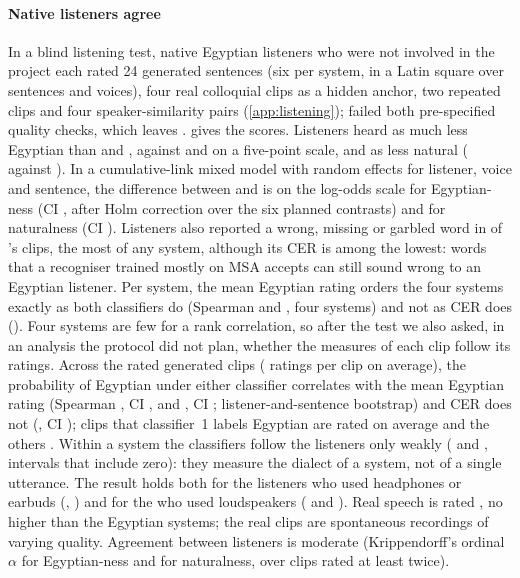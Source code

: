 \paragraph{Native listeners agree}
In a blind listening test,  native Egyptian listeners who were not involved in the project each rated
24 generated sentences (six per system, in a Latin square over sentences and voices), four real colloquial clips as a
hidden anchor, two repeated clips and four speaker-similarity pairs (\cref{app:listening});  failed both
pre-specified quality checks, which leaves .  gives the scores. Listeners heard \cbthree
as much less Egyptian than \vox and \BA,  against  and  on a
five-point scale, and as less natural ( against ). In a cumulative-link mixed
model with random effects for listener, voice and sentence, the difference between \vox and \cbthree is
 on the log-odds scale for Egyptian-ness (CI ,
 after Holm correction over the six planned contrasts) and
 for naturalness (CI ). Listeners also reported a wrong,
missing or garbled word in  of \cbthree's clips, the most of any system, although its CER is among the
lowest: words that a recogniser trained mostly on MSA accepts can still sound wrong to an Egyptian listener. Per system,
the mean Egyptian rating orders the four systems exactly as both classifiers do (Spearman  and
, four systems) and not as CER does (). Four systems are few for a rank correlation, so
after the test we also asked, in an analysis the protocol did not plan, whether the measures of each clip follow its
ratings. Across the  rated generated clips ( ratings per clip on average), the probability
of Egyptian under either classifier correlates with the mean Egyptian rating (Spearman , CI
, and , CI ; listener-and-sentence bootstrap) and CER does not
(, CI ); clips that classifier~1 labels Egyptian are rated
 on average and the others . Within a system the classifiers follow the
listeners only weakly ( and , intervals that include zero): they measure the
dialect of a system, not of a single utterance. The result holds both for the
 listeners who used headphones or earbuds (\cbthree {},
\vox {}) and for the  who used loudspeakers
( and ). Real speech is rated
, no higher than the Egyptian systems; the real clips are spontaneous recordings of varying quality.
Agreement between listeners is moderate (Krippendorff's ordinal $\alpha$  for Egyptian-ness and
 for naturalness, over  clips rated at least twice).

